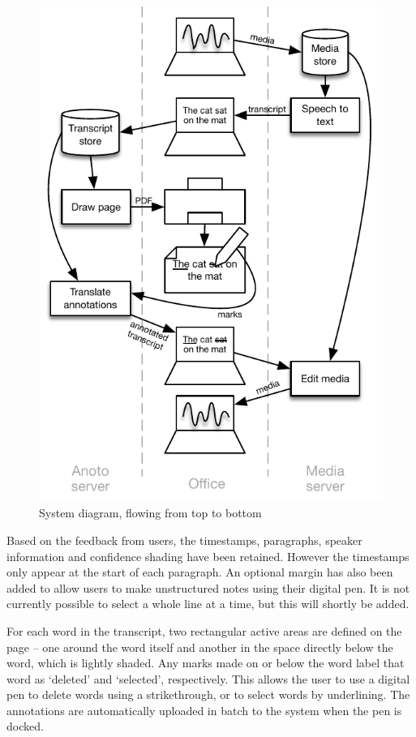 \begin{figure}[h]
  \centering
  \includegraphics[width=\columnwidth]{figs/uist-sys-diagram}
  \caption{System diagram, flowing from top to bottom}
  \label{fig:diagram}
\end{figure}

Based on the feedback from users, the timestamps, paragraphs, speaker
information and confidence shading have been retained. However the timestamps
only appear at the start of each paragraph. An optional margin has also been
added to allow users to make unstructured notes using their digital pen. 
It is not currently possible to select a whole line at a time, but this will
shortly be added.

For each word in the transcript, two rectangular active areas are defined on
the page -- one around the word itself and another in the space directly below
the word, which is lightly shaded. Any marks made on or below the word label
that word as `deleted' and `selected', respectively. This allows the user to
use a digital pen to delete words using a strikethrough, or to select words by
underlining.  The annotations are automatically uploaded in batch to the system
when the pen is docked.

